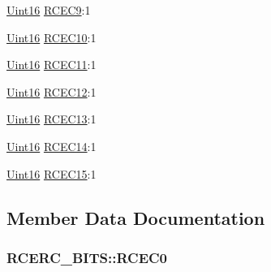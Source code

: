 \begin{DoxyCompactItemize}
\item 
\hyperlink{_d_s_p2833x___device_8h_a59a9f6be4562c327cbfb4f7e8e18f08b}{Uint16} \hyperlink{struct_r_c_e_r_c___b_i_t_s_affdcc7925c04083936902a5d1ffdb0aa}{R\+C\+E\+C9}\+:1
\item 
\hyperlink{_d_s_p2833x___device_8h_a59a9f6be4562c327cbfb4f7e8e18f08b}{Uint16} \hyperlink{struct_r_c_e_r_c___b_i_t_s_a028fca5f02ba66d42ae6343f422213d3}{R\+C\+E\+C10}\+:1
\item 
\hyperlink{_d_s_p2833x___device_8h_a59a9f6be4562c327cbfb4f7e8e18f08b}{Uint16} \hyperlink{struct_r_c_e_r_c___b_i_t_s_a76d9371bbf7b10c99dfe5bf4d2338163}{R\+C\+E\+C11}\+:1
\item 
\hyperlink{_d_s_p2833x___device_8h_a59a9f6be4562c327cbfb4f7e8e18f08b}{Uint16} \hyperlink{struct_r_c_e_r_c___b_i_t_s_aebd955377c71bcd968baf993f4008a48}{R\+C\+E\+C12}\+:1
\item 
\hyperlink{_d_s_p2833x___device_8h_a59a9f6be4562c327cbfb4f7e8e18f08b}{Uint16} \hyperlink{struct_r_c_e_r_c___b_i_t_s_af1102c76e1030f69429811e6e3960aa3}{R\+C\+E\+C13}\+:1
\item 
\hyperlink{_d_s_p2833x___device_8h_a59a9f6be4562c327cbfb4f7e8e18f08b}{Uint16} \hyperlink{struct_r_c_e_r_c___b_i_t_s_aa129a2a4483edb457141bb51a91b53db}{R\+C\+E\+C14}\+:1
\item 
\hyperlink{_d_s_p2833x___device_8h_a59a9f6be4562c327cbfb4f7e8e18f08b}{Uint16} \hyperlink{struct_r_c_e_r_c___b_i_t_s_a83decc4be3f3e70168653d03bfdf9513}{R\+C\+E\+C15}\+:1
\end{DoxyCompactItemize}


\subsection{Member Data Documentation}
\hypertarget{struct_r_c_e_r_c___b_i_t_s_a403ca82b7da1aacee605d4cb2db1c553}{}
\subsubsection[{R\+C\+E\+C0}]{ R\+C\+E\+R\+C\+\_\+\+B\+I\+T\+S\+::\+R\+C\+E\+C0}\label{struct_r_c_e_r_c___b_i_t_s_a403ca82b7da1aacee605d4cb2db1c553}
\hypertarget{struct_r_c_e_r_c___b_i_t_s_a7d9cf7799562e3679a1d418e60b62343}{}
